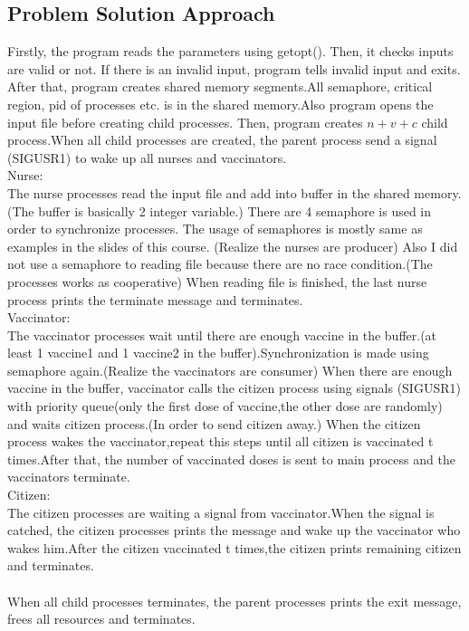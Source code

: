 \documentclass[12pt]{article}
\begin{document}
\subsection{Problem Solution Approach}
Firstly, the program reads the parameters using getopt(). Then, it checks inputs are valid or not. If there is an invalid input, program tells invalid input and exits. After that, program creates shared memory segments.All semaphore, critical region, pid of processes etc. is in the shared memory.Also program opens the input file before creating child processes. Then, program creates $n+v+c$ child process.When all child processes are created, the parent process send a signal (SIGUSR1) to wake up all nurses and vaccinators.\\
Nurse:\\
The nurse processes read the input file and add into buffer in the shared memory. (The buffer is basically 2 integer variable.) There are 4 semaphore is used in order to synchronize processes. The usage of semaphores is mostly same as examples in the slides of this course. (Realize the nurses are producer) Also I did not use a semaphore to reading file because there are no race condition.(The processes works as cooperative) When reading file is finished, the last nurse process prints the terminate message and terminates.\\
Vaccinator:\\
The vaccinator processes wait until there are enough vaccine in the buffer.(at least 1 vaccine1 and 1 vaccine2 in the buffer).Synchronization is made using semaphore again.(Realize the vaccinators are consumer) When there are enough vaccine in the buffer, vaccinator calls the citizen process using signals (SIGUSR1) with priority queue(only the first dose of vaccine,the other dose are randomly) and waits citizen process.(In order to send citizen away.) When the citizen process wakes the vaccinator,repeat this steps until all citizen is vaccinated t times.After that, the number of vaccinated doses is sent to main process and the vaccinators terminate.\\
Citizen:\\
The citizen processes are waiting a signal from vaccinator.When the signal is catched, the citizen processes prints the message and wake up the vaccinator who wakes him.After the citizen vaccinated t times,the citizen prints remaining citizen and terminates.\\
\\
When all child processes terminates, the parent processes prints the exit message, frees all resources and terminates.
\end{document}
